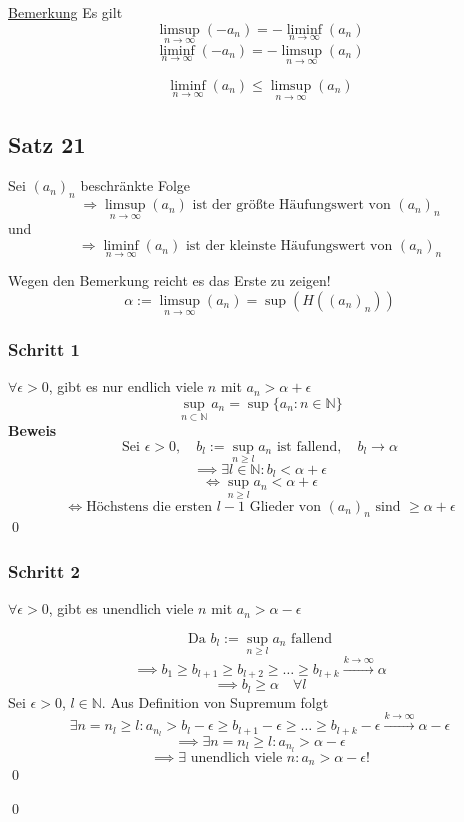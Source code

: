 \documentclass[fleqn]{scrbook}
\newcommand{\N}{\mathbb{N}}
\renewenvironment{proof}{{\bfseries Beweis }}{\qed}
\begin{document}
\underline{Bemerkung} Es gilt
\[\limsup_{n \to \infty} (-a_n) = - \liminf_{n \to \infty}(a_n) \]
\[\liminf_{n \to \infty} (-a_n) = - \limsup_{n \to \infty}(a_n) \]

\[\liminf_{n \to \infty} (a_n) \leq \limsup_{n \to \infty} (a_n)\]

\subsection{Satz 21}

Sei $(a_n)_n$ beschränkte Folge
\[\Longrightarrow \limsup_{n \to \infty} (a_n) \text{ ist der größte Häufungswert von } (a_n)_n\]
und
\[\Longrightarrow \liminf_{n \to \infty} (a_n) \text{ ist der kleinste Häufungswert von } (a_n)_n\]

\begin{proof}

Wegen den Bemerkung reicht es das Erste zu zeigen!
\[\alpha := \limsup_{n \to \infty} (a_n)=\sup(H((a_n)_n))\]

\subsubsection{Schritt 1}
$\forall \epsilon > 0$, gibt es nur endlich viele $n$ mit $a_n> \alpha + \epsilon$
\[\sup_{n \subset \N} a_n = \sup\{a_n:n \in \N\}\]
\begin{proof}
  \[ \text{Sei } \epsilon>0,\quad b_l := \sup_{n \geq l} a_n \text{ ist fallend},\quad b_l \to \alpha\]
  \[\implies \exists l \in \N: b_l < \alpha + \epsilon\]
  \[\Longleftrightarrow \sup_{n \geq l} a_n < \alpha + \epsilon\]
  \[\Longleftrightarrow \text{Höchstens die ersten } l-1 \text{ Glieder von } (a_n)_n \text{ sind } \geq \alpha + \epsilon \]
\end{proof}

\subsubsection{Schritt 2}
$\forall \epsilon > 0$, gibt es unendlich viele $n$ mit $a_n> \alpha - \epsilon$

\begin{proof}
\[\text{Da } b_l:= \sup_{n \geq l} a_n \text{ fallend}\]
\[\implies b_1 \geq b_{l+1} \geq b_{l+2} \geq \ldots \geq b_{l+k} \stackrel{k\to \infty}{\to} \alpha\]
\[\implies b_l \geq \alpha \quad \forall l\]
Sei $\epsilon >0$, $l\in \N$. Aus Definition von Supremum folgt
\[\exists n = n_l \geq l: a_{n_l}>b_l-\epsilon \geq b_{l+1}-\epsilon \geq \ldots \geq b_{l+k}-\epsilon \stackrel{k\to \infty}{\to} \alpha -\epsilon\]
\[\implies \exists n = n_l \geq l: a_{n_l}>\alpha-\epsilon \]
\[\implies \exists \text{ unendlich viele } n: a_n > \alpha - \epsilon!\]
\end{proof}

\end{proof}
\end{document}
